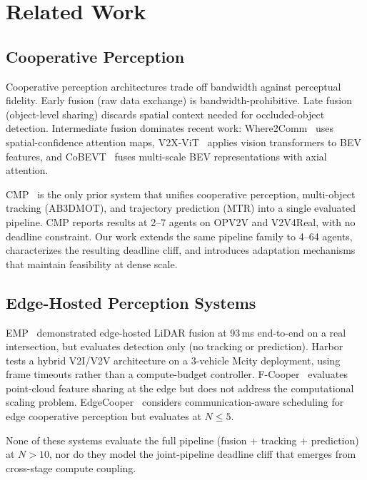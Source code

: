 \section{Related Work}
\label{sec:related}

\subsection{Cooperative Perception}

Cooperative perception architectures trade off bandwidth against
perceptual fidelity.  Early fusion (raw data exchange) is
bandwidth-prohibitive.  Late fusion (object-level sharing) discards
spatial context needed for occluded-object detection.  Intermediate
fusion dominates recent work: Where2Comm~\cite{hu2022where2comm}
uses spatial-confidence attention maps,
V2X-ViT~\cite{v2xvit2022} applies vision transformers to BEV
features, and CoBEVT~\cite{xu2022cobevt} fuses multi-scale BEV
representations with axial attention.

CMP~\cite{cmp2024,cmp_ieee_2023} is the only prior system that
unifies cooperative perception, multi-object tracking (AB3DMOT), and
trajectory prediction (MTR) into a single evaluated pipeline.  CMP
reports results at 2--7 agents on OPV2V and V2V4Real, with no
deadline constraint.  Our work extends the same pipeline family to
4--64 agents, characterizes the resulting deadline cliff, and
introduces adaptation mechanisms that maintain feasibility at dense
scale.

\subsection{Edge-Hosted Perception Systems}

EMP~\cite{EMP} demonstrated edge-hosted LiDAR fusion at 93\,ms
end-to-end on a real intersection, but evaluates detection only (no
tracking or prediction).  Harbor~\cite{harbor} tests a hybrid
V2I/V2V architecture on a 3-vehicle Mcity deployment, using frame
timeouts rather than a compute-budget controller.
F-Cooper~\cite{fcooper} evaluates point-cloud feature sharing
at the edge but does not address the computational scaling problem.
EdgeCooper~\cite{edgecooper2023} considers communication-aware
scheduling for edge cooperative perception but evaluates at
$N \leq 5$.

None of these systems evaluate the full pipeline (fusion + tracking +
prediction) at $N > 10$, nor do they model the joint-pipeline deadline
cliff that emerges from cross-stage compute coupling.

